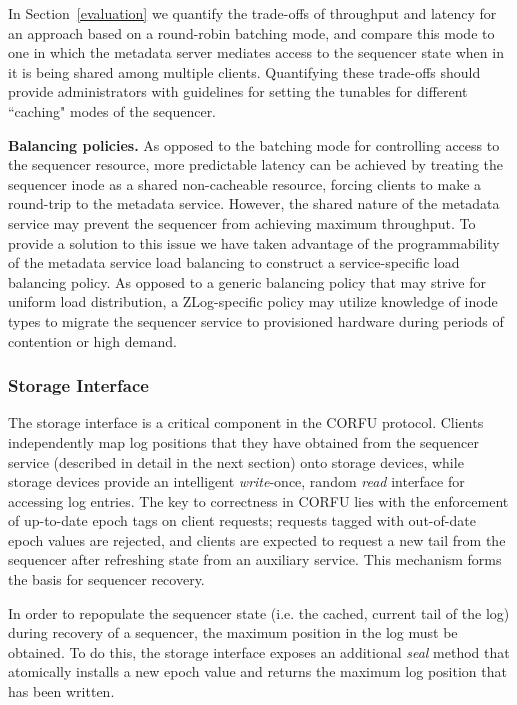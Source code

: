 \documentclass[preprint]{sigplanconf-eurosys}
\begin{document}
In Section~\ref{evaluation} we quantify the trade-offs of throughput and
latency for an approach based on a round-robin batching mode, and compare this
mode to one in which the metadata server mediates access to the sequencer state
when in it is being shared among multiple clients. Quantifying these trade-offs
should provide administrators with guidelines for setting the tunables for
different ``caching" modes of the sequencer.

{\bf Balancing policies.}
As opposed to the batching mode for controlling access to the sequencer
resource, more predictable latency can be achieved by treating the sequencer
inode as a shared non-cacheable resource, forcing clients to make a round-trip
to the metadata service. However, the shared nature of the metadata service
may prevent the sequencer from achieving maximum throughput. To provide a
solution to this issue we have taken advantage of the programmability of the
metadata service load balancing to construct a service-specific load balancing
policy. As opposed to a generic balancing policy that may strive for uniform
load distribution, a ZLog-specific policy may utilize knowledge of inode types
to migrate the sequencer service to provisioned hardware during periods of
contention or high demand.

\subsubsection{Storage Interface}

The storage interface is a critical component in the CORFU protocol. Clients
independently map log positions that they have obtained from the sequencer
service (described in detail in the next section) onto storage devices, while
storage devices provide an intelligent \emph{write}-once, random \emph{read}
interface for accessing log entries. The key to correctness in CORFU lies with
the enforcement of up-to-date epoch tags on client requests; requests tagged
with out-of-date epoch values are rejected, and clients are expected to
request a new tail from the sequencer after refreshing state from an auxiliary
service.  This mechanism forms the basis for sequencer recovery.

In order to repopulate the sequencer state (i.e. the cached, current tail of
the log) during recovery of a sequencer,
the maximum position in the log must be obtained. To do this, the storage
interface exposes an additional \emph{seal} method that atomically installs a
new epoch value and returns the maximum log position that has been written.
\end{document}
